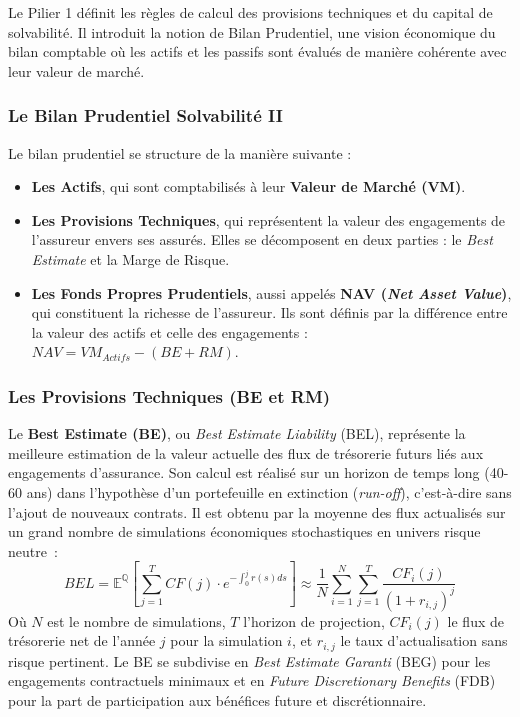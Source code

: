Le Pilier 1 définit les règles de calcul des provisions techniques et du capital de solvabilité. Il introduit la notion de Bilan Prudentiel, une vision économique du bilan comptable où les actifs et les passifs sont évalués de manière cohérente avec leur valeur de marché.

\subsubsection{Le Bilan Prudentiel Solvabilité II}

Le bilan prudentiel se structure de la manière suivante :
\begin{itemize}
    \item \textbf{Les Actifs}, qui sont comptabilisés à leur \textbf{Valeur de Marché (VM)}.
    \item \textbf{Les Provisions Techniques}, qui représentent la valeur des engagements de l'assureur envers ses assurés. Elles se décomposent en deux parties : le \textit{Best Estimate} et la Marge de Risque.
    \item \textbf{Les Fonds Propres Prudentiels}, aussi appelés \textbf{NAV (\textit{Net Asset Value})}, qui constituent la richesse de l'assureur. Ils sont définis par la différence entre la valeur des actifs et celle des engagements : $NAV = VM_{Actifs} - (BE + RM)$.
\end{itemize}

\subsubsection{Les Provisions Techniques (BE et RM)}

Le \textbf{Best Estimate (BE)}, ou \textit{Best Estimate Liability} (BEL), représente la meilleure estimation de la valeur actuelle des flux de trésorerie futurs liés aux engagements d'assurance. Son calcul est réalisé sur un horizon de temps long (40-60 ans) dans l'hypothèse d'un portefeuille en extinction (\textit{run-off}), c'est-à-dire sans l'ajout de nouveaux contrats. Il est obtenu par la moyenne des flux actualisés sur un grand nombre de simulations économiques stochastiques en univers risque neutre~:
\begin{equation}
    BEL = \mathbb{E}^{\mathbb{Q}} \left[ \sum_{j=1}^{T} CF(j) \cdot e^{-\int_0^j r(s)ds} \right] \approx \frac{1}{N}\sum_{i=1}^{N}\sum_{j=1}^{T}\frac{CF_{i}(j)}{(1+r_{i,j})^{j}}
\end{equation}
Où $N$ est le nombre de simulations, $T$ l'horizon de projection, $CF_{i}(j)$ le flux de trésorerie net de l'année $j$ pour la simulation $i$, et $r_{i,j}$ le taux d'actualisation sans risque pertinent. Le BE se subdivise en \textit{Best Estimate Garanti} (BEG) pour les engagements contractuels minimaux et en \textit{Future Discretionary Benefits} (FDB) pour la part de participation aux bénéfices future et discrétionnaire.

